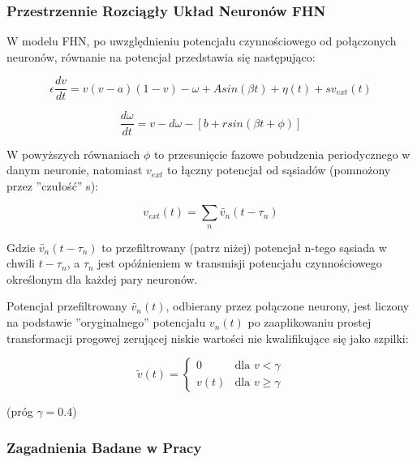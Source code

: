   \subsubsection{Przestrzennie Rozciągły Układ Neuronów FHN}
  \label{sec:przestrzennie_rozciagly_fhn}

  W modelu FHN, po uwzględnieniu potencjału czynnościowego od połączonych neuronów, równanie na potencjał przedstawia się następująco:

  \begin{equation} \label{eq:v2}
    \epsilon \frac{dv}{dt} = v(v-a)(1-v)- \omega + A sin(\beta t) + \eta(t) + sv_{ext}(t)
  \end{equation}

  \begin{equation} \label{eq:w2}
    \frac{d \omega}{dt} = v - d \omega - [b + r sin(\beta t + \phi)]
  \end{equation}

  W powyższych równaniach $\phi$ to przesunięcie fazowe pobudzenia periodycznego w danym neuronie, natomiast $v_{ext}$ to łączny potencjał od sąsiadów (pomnożony przez ''czułość'' s):

  \begin{equation}
    v_{ext}(t) = \displaystyle\sum\limits_{n} \widetilde{v_{n}}(t-\tau_{n})
  \end{equation}

  Gdzie $\widetilde{v_{n}}(t-\tau_{n})$ to przefiltrowany (patrz niżej) potencjał n-tego sąsiada w chwili $t-\tau_{n}$, a $\tau_{n}$ jest opóźnieniem w transmisji potencjału czynnościowego określonym dla każdej pary neuronów.

  Potencjał przefiltrowany $\widetilde{v_{n}}(t)$, odbierany przez połączone neurony, jest liczony na podstawie ''oryginalnego'' potencjału $v_{n}(t)$ po zaaplikowaniu prostej transformacji progowej zerującej niskie wartości nie kwalifikujące się jako szpilki:

  \begin{equation}
    \tilde{v}(t) = 
    \begin{cases}
      0 & \text{dla } v < \gamma \\
      v(t) & \text{dla } v \geq \gamma 
    \end{cases}
  \end{equation}

  (próg $\gamma = 0.4$)
  
  \subsubsection{Zagadnienia Badane w Pracy}

